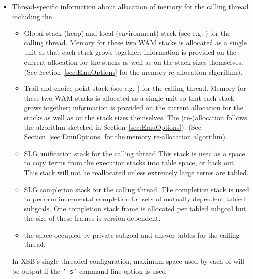 \begin{description}
\begin{itemize}
\item Thread-specific information about allocation of memory
  for the calling thread including the  
\begin{itemize} 
\item Global stack (heap) and local (environment) stack (see e.g.
  \cite{AitK90}) for the calling thread. Memory for these two WAM
  stacks is allocated as a single unit so that each stack grows
  together; information is provided on the current allocation for the
  stacks as well as on the stack sizes themselves.  (See
  Section~\ref{sec:EmuOptions} for the memory re-allocation
  algorithm).  
%
\item Trail and choice point stack (see e.g. \cite{AitK90}) for the
  calling thread.  Memory for these two WAM stacks is allocated as a
  single unit so that each stack grows together; information is
  provided on the current allocation for the stacks as well as on the
  stack sizes themselves.  The (re-)allocation follows the algorithm
  sketched in Section~\ref{sec:EmuOptions}).  (See
  Section~\ref{sec:EmuOptions} for the memory re-allocation
  algorithm).  
%
\item SLG unification stack for the calling thread This stack is used
  as a space to copy terms from the execution stacks into table space,
  or back out.  This stack will not be reallocated unless extremely
  large terms are tabled.
%
\item SLG completion stack for the calling thread.  The completion
  stack is used to perform incremental completion for sets of mutually
  dependent tabled subgoals.  One completion stack frame is allocated
  per tabled subgoal \cite{SaSw98} but the size of these frames is
  version-dependent.
%
\item the space occupied by private subgoal and answer tables for the
  calling thread. 

\end{itemize}
In XSB's single-threaded configuration, maximum space used by each of
will be output if the {\tt '-s'} command-line option is used


\end{itemize}
\end{description}
